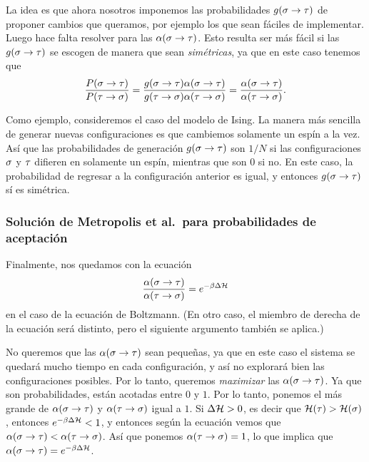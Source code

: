 La idea es que ahora nosotros imponemos las probabilidades $g(\ss \to \tt)$ de proponer cambios que queramos, por ejemplo los que sean fáciles de implementar.
Luego hace falta resolver para las $\alpha(\ss \to \tt)$. Esto resulta ser más fácil si las $g(\ss \to \tt)$ se escogen de manera que sean \emph{simétricas}, ya que en este caso
tenemos que
\begin{equation}
\frac{P(\ss \to \tt)}{P(\tt \to \ss)}  = \frac{g(\ss \to \tt) \alpha(\ss \to \tt)}{g(\tt \to \ss) \alpha(\tt \to \ss)}  = \frac{\alpha(\ss \to \tt)}{\alpha(\tt \to \ss)}.
\end{equation}

Como ejemplo, consideremos el caso del modelo de Ising. La manera más sencilla de generar nuevas configuraciones es que cambiemos solamente un espín a la vez.
Así que las probabilidades de generación $g(\ss \to \tt)$ son $1/N$ si las configuraciones $\ss$ y $\tt$ difieren en solamente un espín, mientras que son $0$ si no. En este caso, la probabilidad de regresar a la configuración anterior es igual, y entonces $g(\ss \to \tt)$ sí es simétrica.

\subsubsection{Solución de Metropolis et al.\ para probabilidades de aceptación}
Finalmente, nos quedamos con la ecuación
\begin{equation}
  \frac{\alpha(\ss \to \tt)}{\alpha(\tt \to \ss)} = e^{-\beta \Delta \HH}
\end{equation}
en el caso de la ecuación de Boltzmann. (En otro caso, el miembro de derecha de la ecuación será distinto, pero el siguiente argumento también se aplica.)

No queremos que las $\alpha(\ss \to \tt)$ sean pequeñas, ya que en este caso el sistema se quedará mucho tiempo en cada configuración, y así no explorará bien las configuraciones posibles. Por lo tanto, queremos \emph{maximizar} las $\alpha(\ss \to \tt)$.  Ya que son probabilidades, están acotadas entre $0$ y $1$. Por lo tanto, ponemos el más grande de $\alpha(\ss \to \tt)$ y $\alpha(\tt \to \ss)$ igual a $1$. Si $\Delta \HH > 0$, es decir que $\HH(\tt) > \HH(\ss)$, entonces $e^{-\beta \Delta \HH} < 1$, y entonces según la ecuación vemos que $\alpha(\ss \to \tt) < \alpha(\tt \to \ss)$. Así que ponemos $\alpha(\tt \to \ss) = 1$, lo que implica que $\alpha(\ss \to \tt) = e^{-\beta \Delta \HH}$.

